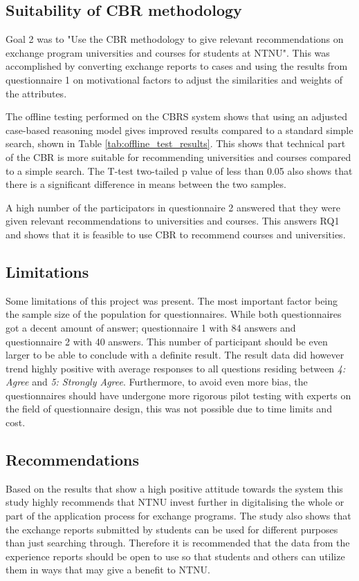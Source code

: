 \subsection{Suitability of CBR methodology}

Goal 2 was to "Use the CBR methodology to give relevant recommendations on exchange program universities and courses for students at NTNU". This was accomplished by converting exchange reports to cases and using the results from questionnaire 1 on motivational factors to adjust the similarities and weights of the attributes.

The offline testing performed on the CBRS system shows that using an adjusted case-based reasoning model gives improved results compared to a standard simple search, shown in Table \ref{tab:offline_test_results}. This shows that technical part of the CBR is more suitable for recommending universities and courses compared to a simple search. The T-test two-tailed p value of less than 0.05 also shows that there is a significant difference in means between the two samples.  

A high number of the participators in questionnaire 2 answered that they were given relevant recommendations to universities and courses. This answers RQ1 and shows that it is feasible to use CBR to recommend courses and universities.

\subsection{Limitations}
Some limitations of this project was present. The most important factor being the sample size of the population for questionnaires. While both questionnaires got a decent amount of answer;  questionnaire 1 with 84 answers and questionnaire 2 with 40 answers. This number of participant should be even larger to be able to conclude with a definite result. The result data did however trend highly positive with average responses to all questions residing between \textit{4: Agree} and \textit{5: Strongly Agree}. Furthermore, to avoid even more bias, the questionnaires should have undergone more rigorous pilot testing with experts on the field of questionnaire design, this was not possible due to time limits and cost. 

\subsection{Recommendations}
Based on the results that show a high positive attitude towards the system this study highly recommends that NTNU invest further in digitalising the whole or part of the application process for exchange programs. The study also shows that the exchange reports submitted by students can be used for different purposes than just searching through. Therefore it is recommended that the data from the experience reports should be open to use so that students and others can utilize them in ways that may give a benefit to NTNU. 



\cleardoublepage